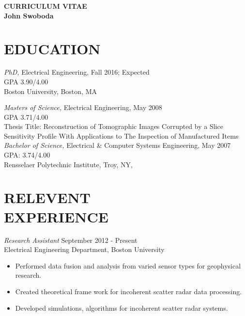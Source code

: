 
\thispagestyle{empty}

\begin{center}
{\LARGE {\bf CURRICULUM VITAE}}\\
\vspace{0.5in}
{\large {\bf John Swoboda}}
\end{center}

\section*{EDUCATION}{\sl PhD,} Electrical Engineering, Fall 2016; Expected \\
                GPA 3.90/4.00 \\
                Boston University, Boston, MA
	       

{\sl Masters of Science,} Electrical Engineering, May 2008 \\
                 GPA 3.71/4.00\\
                Thesis Title: Reconstruction of Tomographic Images Corrupted by a Slice Sensitivity Profile With Applications to The Inspection of Manufactured Items\\
 {\sl Bachelor of Science,} Electrical \& Computer Systems Engineering, May 2007  \\
                GPA: 3.74/4.00\\
                Rensselaer Polytechnic Institute, Troy, NY, \\
                
 
 

 
\section*{RELEVENT \\ EXPERIENCE}
 {\sl Research Assistant} \hfill            September 2012 - Present \\
                Electrical Engineering Department, Boston University 
                 \begin{itemize}  \itemsep -2pt %
                 \item Performed data fusion and analysis from varied sensor types for geophysical research.
                 \item Created theoretical frame work for incoherent scatter radar data processing.
                 \item Developed simulations, algorithms for incoherent scatter radar systems.
                 \end{itemize} 

